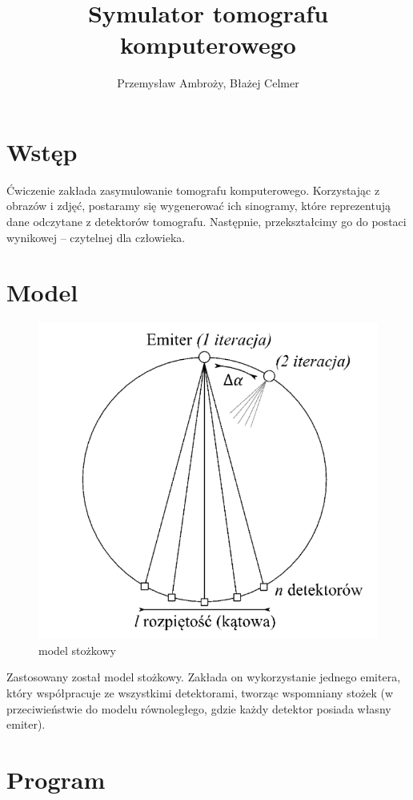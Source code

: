 \documentclass[polish,polish,a4paper]{article}
\title{Symulator tomografu komputerowego}
\author{Przemysław Ambroży, Błażej Celmer}
\begin{document}
 
	\maketitle
	
	\section{Wstęp}
		Ćwiczenie zakłada zasymulowanie tomografu komputerowego. 
		Korzystając z obrazów i zdjęć, postaramy się wygenerować ich sinogramy, 
		które reprezentują dane odczytane z detektorów tomografu.
		Następnie, przekształcimy go do postaci wynikowej -- czytelnej dla człowieka.
 	
	\section{Model}
			\begin{figure}[h]
				\centering
				\includegraphics[scale=0.7]{img/model.png}
				\caption{model stożkowy}
			\end{figure}
		\noindent Zastosowany został model stożkowy.
		 Zakłada on wykorzystanie jednego emitera,
		  który współpracuje ze wszystkimi detektorami, tworząc wspomniany stożek 
		  (w przeciwieństwie do modelu równoległego, gdzie każdy detektor posiada własny emiter).
		
	\section{Program}
\end{document}
